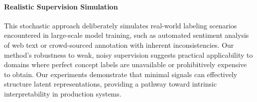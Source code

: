 \paragraph{Realistic Supervision Simulation}
This stochastic approach deliberately simulates real-world labeling scenarios encountered in large-scale model training, such as automated sentiment analysis of web text or crowd-sourced annotation with inherent inconsistencies. Our method's robustness to weak, noisy supervision suggests practical applicability to domains where perfect concept labels are unavailable or prohibitively expensive to obtain. Our experiments demonstrate that minimal signals can effectively structure latent representations, providing a pathway toward intrinsic interpretability in production systems.
